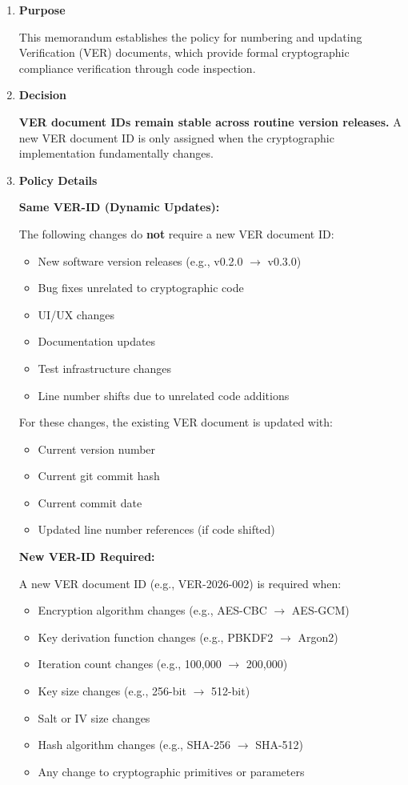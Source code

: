\documentclass[11pt,letterpaper]{article}
\newcommand{\dmsection}[1]{\item \textbf{#1}\par}
\begin{document}
\begin{enumerate}

\dmsection{Purpose}

This memorandum establishes the policy for numbering and updating Verification (VER) documents, which provide formal cryptographic compliance verification through code inspection.

\dmsection{Decision}

\textbf{VER document IDs remain stable across routine version releases.} A new VER document ID is only assigned when the cryptographic implementation fundamentally changes.

\dmsection{Policy Details}

\textbf{Same VER-ID (Dynamic Updates):}

The following changes do \textbf{not} require a new VER document ID:
\begin{itemize}
    \item New software version releases (e.g., v0.2.0 $\rightarrow$ v0.3.0)
    \item Bug fixes unrelated to cryptographic code
    \item UI/UX changes
    \item Documentation updates
    \item Test infrastructure changes
    \item Line number shifts due to unrelated code additions
\end{itemize}

For these changes, the existing VER document is updated with:
\begin{itemize}
    \item Current version number
    \item Current git commit hash
    \item Current commit date
    \item Updated line number references (if code shifted)
\end{itemize}

\textbf{New VER-ID Required:}

A new VER document ID (e.g., VER-2026-002) is required when:
\begin{itemize}
    \item Encryption algorithm changes (e.g., AES-CBC $\rightarrow$ AES-GCM)
    \item Key derivation function changes (e.g., PBKDF2 $\rightarrow$ Argon2)
    \item Iteration count changes (e.g., 100,000 $\rightarrow$ 200,000)
    \item Key size changes (e.g., 256-bit $\rightarrow$ 512-bit)
    \item Salt or IV size changes
    \item Hash algorithm changes (e.g., SHA-256 $\rightarrow$ SHA-512)
    \item Any change to cryptographic primitives or parameters
\end{itemize}


\end{enumerate}
\end{document}

